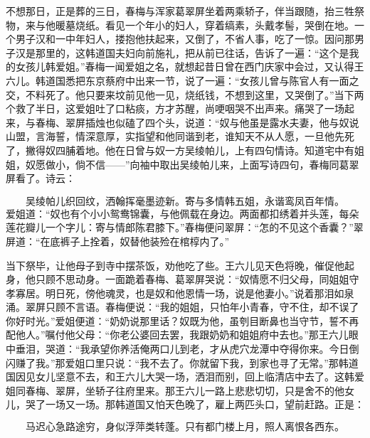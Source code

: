 不想那日，正是葬的三日，春梅与浑家葛翠屏坐着两乘轿子，伴当跟随，抬三牲祭物，来与他暖墓烧纸。看见一个年小的妇人，穿着缟素，头戴孝髻，哭倒在地。一个男子汉和一中年妇人，搂抱他扶起来，又倒了，不省人事，吃了一惊。因问那男子汉是那里的，这韩道国夫妇向前施礼，把从前已往话，告诉了一遍：“这个是我的女孩儿韩爱姐。”春梅一闻爱姐之名，就想起昔日曾在西门庆家中会过，又认得王六儿。韩道国悉把东京蔡府中出来一节，说了一遍：“女孩儿曾与陈官人有一面之交，不料死了。他只要来坟前见他一见，烧纸钱，不想到这里，又哭倒了。”当下两个救了半日，这爱姐吐了口粘痰，方才苏醒，尚哽咽哭不出声来。痛哭了一场起来，与春梅、翠屏插烛也似磕了四个头，说道：“奴与他虽是露水夫妻，他与奴说山盟，言海誓，情深意厚，实指望和他同谐到老，谁知天不从人愿，一旦他先死了，撇得奴四脯着地。他在日曾与奴一方吴绫帕儿，上有四句情诗。知道宅中有姐姐，奴愿做小，倘不信——”向袖中取出吴绫帕儿来，上面写诗四句，春梅同葛翠屏看了。诗云：

\[
吴绫帕儿织回纹，洒翰挥毫墨迹新。
寄与多情韩五姐，永谐鸾凤百年情。
\]
爱姐道：“奴也有个小小鸳鸯锦囊，与他佩载在身边。两面都扣绣着并头莲，每朵莲花瓣儿一个字儿：寄与情郎陈君膝下。”春梅便问翠屏：“怎的不见这个香囊？”翠屏道：“在底裤子上拴着，奴替他装殓在棺椁内了。”

当下祭毕，让他母子到寺中摆茶饭，劝他吃了些。王六儿见天色将晚，催促他起身，他只顾不思动身。一面跪着春梅、葛翠屏哭说：“奴情愿不归父母，同姐姐守孝寡居。明日死，傍他魂灵，也是奴和他恩情一场，说是他妻小。”说着那泪如泉涌。翠屏只顾不言语。春梅便说：“我的姐姐，只怕年小青春，守不住，却不误了你好时光。”爱姐便道：“奶奶说那里话？奴既为他，虽刳目断鼻也当守节，誓不再配他人。”嘱付他父母：“你老公婆回去罢，我跟奶奶和姐姐府中去也。”那王六儿眼中垂泪，哭道：“我承望你养活俺两口儿到老，才从虎穴龙潭中夺得你来。今日倒闪赚了我。”那爱姐口里只说：“我不去了。你就留下我，到家也寻了无常。”那韩道国因见女儿坚意不去，和王六儿大哭一场，洒泪而别，回上临清店中去了。这韩爱姐同春梅、翠屏，坐轿子往府里来。那王六儿一路上悲悲切切，只是舍不的他女儿，哭了一场又一场。那韩道国又怕天色晚了，雇上两匹头口，望前赶路。正是：

\[
马迟心急路途穷，身似浮萍类转蓬。
只有都门楼上月，照人离恨各西东。
\]
